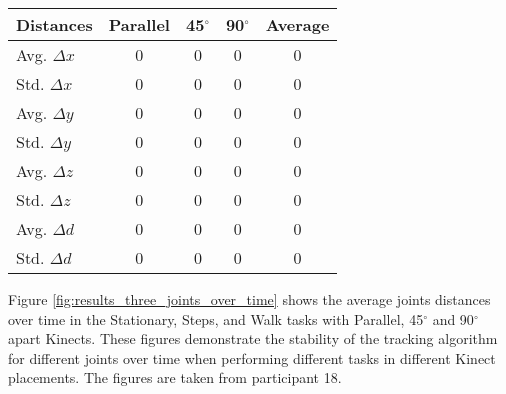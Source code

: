 \begin{table*}[!htb]
{    \begin{tabularx}{1.0\columnwidth}{||X c c c c||} 
     \hline
     \textbf{Distances} & \textbf{Parallel} & \textbf{45$^{\circ}$} & \textbf{90$^{\circ}$} & \textbf{Average} \\ [0.5ex] 
     \hline\hline
     Avg. $\Delta x$ & 0 & 0 & 0 & 0 \\
     \hline
     Std. $\Delta x$ & 0 & 0 & 0 & 0 \\
     \hline
     Avg. $\Delta y$ & 0 & 0 & 0 & 0 \\
     \hline
     Std. $\Delta y$ & 0 & 0 & 0 & 0 \\
     \hline
     Avg. $\Delta z$ & 0 & 0 & 0 & 0 \\
     \hline
     Std. $\Delta z$ & 0 & 0 & 0 & 0 \\
     \hline
     Avg. $\Delta d$ & 0 & 0 & 0 & 0 \\
     \hline
     Std. $\Delta d$ & 0 & 0 & 0 & 0 \\
     \hline
    \end{tabularx}    
  }
\caption{Average coordinates distances in the Walk task for three different Kinect configurations}
\label{table:results_three_coordinates_values}
\end{table*}

Figure \ref{fig:results_three_joints_over_time} shows the average joints distances over time in the Stationary, Steps, and Walk tasks with Parallel, 45$^{\circ}$ and 90$^{\circ}$ apart Kinects. These figures demonstrate the stability of the tracking algorithm for different joints over time when performing different tasks in different Kinect placements. The figures are taken from participant 18.

\begin{figure*}[!htb]
  \centering

  \subfloat[Stationary]{
     
    
    
  } \\
  \subfloat[Steps]{
     
    
    
  } \\
  \subfloat[Walk]{
     
    
    
  }

  \caption{Average coordinates distances over time in the Stationary, Steps, and Walk tasks with Parallel, 45$^{\circ}$, and 90 $^{\circ}$ apart Kinects.}

  \label{fig:results_three_joints_over_time}
\end{figure*}

